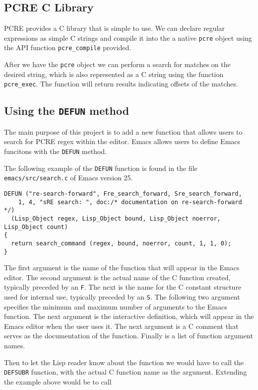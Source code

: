 \documentclass[12pt]{article}
\begin{document}
\subsection{PCRE C Library}

PCRE provides a C library that is simple to use. We can declare regular expressions as simple C strings and compile it into the a native \texttt{pcre} object using the API function \texttt{pcre\_compile} provided.

After we have the \texttt{pcre} object we can perform a search for matches on the desired string, which is also represented as a C string using the function \texttt{pcre\_exec}. The function will return results indicating offsets of the matches.



\subsection{Using the \texttt{DEFUN} method}

The main purpose of this project is to add a new function that allows users to search for PCRE regex within the editor. Emacs allows users to define Emacs funcitons with the \texttt{DEFUN} method.

The following example of the \texttt{DEFUN} function is found in the file \texttt{emacs/src/search.c} of Emacs version 25.

\begin{verbatim}
DEFUN ("re-search-forward", Fre_search_forward, Sre_search_forward,
    1, 4, "sRE search: ", doc:/* documentation on re-search-forward */)
  (Lisp_Object regex, Lisp_Object bound, Lisp_Object noerror, Lisp_Object count)
{
  return search_command (regex, bound, noerror, count, 1, 1, 0);
}
\end{verbatim}

The first argument is the name of the function that will appear in the Emacs editor. The second argument is the actual name of the C function created, typically preceded by an \texttt{F}. The next is the name for the C constant structure used for internal use, typically preceded by an \texttt{S}. The following two argument specifies the minimum and maximum number of arguments to the Emacs function. The next argument is the interactive definition, which will appear in the Emacs editor when the user uses it. The next argument is a C comment that serves as the documentation of the function. Finally is a list of function argument names.

Then to let the Lisp reader know about the function we would have to call the \texttt{DEFSUBR} function, with the actual C function name as the argument. Extending the example above would be to call
\end{document}
